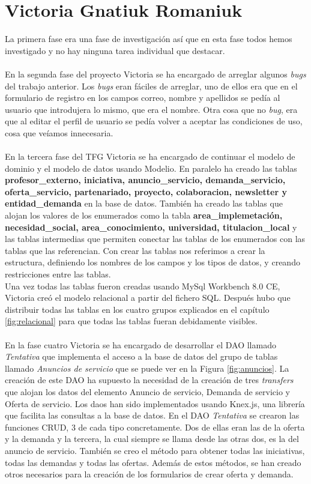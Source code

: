 \documentclass[11pt]{book}
\begin{document}
	\section{Victoria Gnatiuk Romaniuk}
	La primera fase era una fase de investigación así que en esta fase todos hemos investigado y no hay ninguna tarea individual que destacar.\\\\
	En la segunda fase del proyecto Victoria se ha encargado de arreglar algunos \textit{bugs} del trabajo anterior. Los \textit{bugs} eran fáciles de arreglar, uno de ellos era que en el formulario de registro en los campos correo, nombre y apellidos se pedía al usuario que introdujera lo mismo, que era el nombre. Otra cosa que no \textit{bug}, era que al editar el perfil de usuario se pedía volver a aceptar las condiciones de uso, cosa que veíamos innecesaria.\\\\
	En la tercera fase del TFG Victoria se ha encargado de continuar el modelo de dominio y el modelo de datos usando Modelio. En paralelo ha creado las tablas \textbf{profesor\_externo, iniciativa, anuncio\_servicio, demanda\_servicio, oferta\_servicio, partenariado, proyecto, colaboracion, newsletter y entidad\_demanda} en la base de datos. También ha creado las tablas que alojan los valores de los enumerados como la tabla \textbf{area\_implemetación, necesidad\_social, area\_conocimiento, universidad, titulacion\_local} y las tablas intermedias que permiten conectar las tablas de los enumerados con las tablas que las referencian. Con crear las tablas nos referimos a crear la estructura, definiendo los nombres de los campos y los tipos de datos, y creando restricciones entre las tablas.\\
	Una vez todas las tablas fueron creadas usando MySql Workbench 8.0 CE, Victoria creó el modelo relacional a partir del fichero SQL. Después hubo que distribuir todas las tablas en los cuatro grupos explicados en el capítulo \ref{fig:relacional} para que todas las tablas fueran debidamente visibles.\\\\
	En la fase cuatro Victoria se ha encargado de desarrollar el DAO llamado \textit{Tentativa} que implementa el acceso a la base de datos del grupo de tablas llamado \textit{Anuncios de servicio} que se puede ver en la Figura \ref{fig:anuncios}. La creación de este DAO ha supuesto la necesidad de la creación de tres \textit{transfers} que alojan los datos del elemento Anuncio de servicio, Demanda de servicio y Oferta de servicio. Los daos han sido implementados usando Knex.js, una librería que facilita las consultas a la base de datos. En el DAO \textit{Tentativa} se crearon las funciones CRUD, 3 de cada tipo concretamente. Dos de ellas eran las de la oferta y la demanda y la tercera, la cual siempre se llama desde las otras dos, es la del anuncio de servicio. También se creo el método para obtener todas las iniciativas, todas las demandas y todas las ofertas. Además de estos métodos, se han creado otros necesarios para la creación de los formularios de crear oferta y demanda. \\
\end{document}
